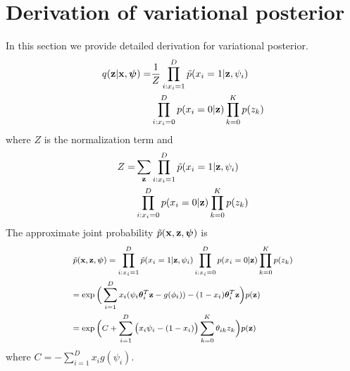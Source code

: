 \documentclass[twoside]{article}
\newcommand{\bx}{\mathbf{x}}
\newcommand{\bz}{\mathbf{z}}
\newcommand{\btheta}{\bm{\theta}}
\newcommand{\bpsi}{\bm{\psi}}
\newcommand{\tp}{\Tilde{p}}
\begin{document}




\section{Derivation of variational posterior}
In this section we provide detailed derivation for variational posterior. 
\begin{align}
    q(\bz|\bx, \bpsi) = & \frac{1}{Z} 
     \prod_{i: x_i =1}^D\tp(x_i=1|\bz, \psi_i) \nonumber \\
     & \prod_{i: x_i=0}^D p(x_i=0|\bz)\prod_{k=0}^K p(z_k)
\label{eq:posterior}
\end{align}
where $Z$ is the normalization term and 
\begin{align}
Z = &  \sum_{\bz}\prod_{i: x_i =1}^D\tp(x_i=1|\bz, \psi_i) \nonumber \\
& \prod_{i: x_i=0}^D p(x_i=0|\bz)\prod_{k=0}^K p(z_k)
\end{align}
The approximate joint probability $\tp(\bx, \bz, \bpsi)$ is
\begin{align}
    &\medmath{\tp(\bx, \bz, \bpsi)  = \prod_{i: x_i =1}^D\tp(x_i=1|\bz, \psi_i) \prod_{i: x_i=0}^D p(x_i=0|\bz)\prod_{k=0}^K p(z_k)} \nonumber\\
    & \medmath{= \exp \bigg(\sum_{i=1}^D x_i(\psi_i\btheta_i^T\bz - g(\phi_i)) - (1-x_i)\btheta_i^T\bz\bigg)p(\bz) }\nonumber \\
    & \medmath{ = \exp{\bigg(C + \sum_{i=1}^D\big(x_i\psi_i-(1-x_i)\big)\sum_{k=0}^K\theta_{ik}z_k\bigg)}p(\bz)}
    \label{eq:jointprob}
\end{align}
where $C=-\sum_{i=1}^D x_ig(\psi_i)$.
\end{document}

